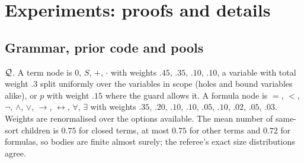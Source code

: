 \providecommand{\expbrk}{\hfil\penalty0\hfilneg}
\providecommand{\expth}[1]{\textsf{#1}}
\providecommand{\expgen}[1]{\textit{#1}}

\section{Experiments: proofs and details}\label{app:exp}

\subsection{Grammar, prior code and pools}\label{app:exp:impl}

\emph{$\mathcal{Q}$.} A term node is $0$, $S$, $+$, $\cdot$ with weights $.45$, $.35$, $.10$, $.10$, a variable with total weight $.3$ split uniformly over the variables in scope (holes and bound variables alike), or $p$ with weight $.15$ where the guard allows it. A formula node is $=$, $<$, $\neg$, $\wedge$, $\vee$, $\to$, $\leftrightarrow$, $\forall$, $\exists$ with weights $.35$, $.20$, $.10$, $.10$, $.05$, $.10$, $.02$, $.05$, $.03$. Weights are renormalised over the options available. The mean number of same-sort children is $0.75$ for closed terms, at most $0.75$ for other terms and $0.72$ for formulas, so bodies are finite almost surely; the referee's exact size distributions agree.

